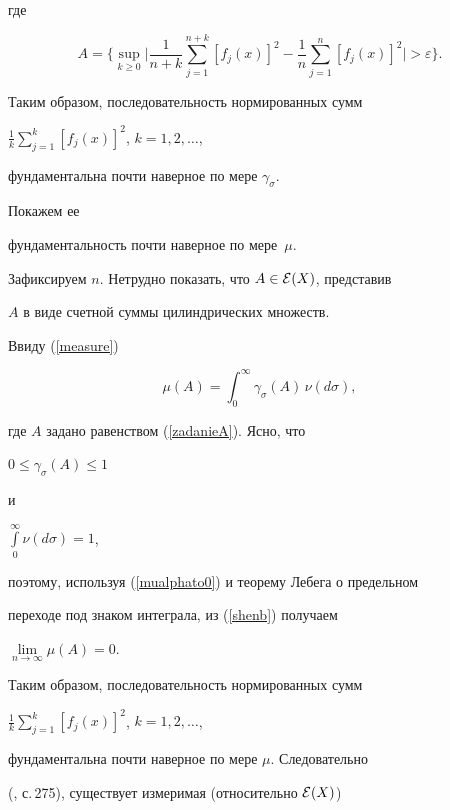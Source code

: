 где


\begin{equation}


A=\bigg\{\sup_{k\ge0}\bigg|\frac1{n+k}\sum_{j=1}^{n+k}[f_j(x)]^2


-\frac1n\sum_{j=1}^n[f_j(x)]^2\bigg|>\varepsilon\bigg\}.


\label{zadanieA}


\end{equation}


Таким образом, последовательность нормированных сумм


$\frac1k\sum\limits_{j=1}^k[f_j(x)]^2$, $k=1,2,\dotsc$,


фундаментальна почти наверное по мере $\gamma_\sigma$.





Покажем ее


фундаментальность почти наверное по мере~$\mu$.


Зафиксируем $n$. Нетрудно показать, что $A\in{\cal E}(X)$, представив


$A$ в виде счетной суммы цилиндрических множеств.





Ввиду (\ref{measure})


\begin{equation}


\mu(A)=\int_0^\infty\gamma_\sigma(A)\,\nu(d\sigma),


\label{shenb}


\end{equation}


где $A$ задано равенством (\ref{zadanieA}). Ясно, что


$0\le\gamma_\sigma(A)\le1$


и


$\int\limits_0^\infty \nu(d\sigma)=1$,


поэтому, используя (\ref{mualphato0}) и теорему Лебега о предельном 


переходе под знаком интеграла, из (\ref{shenb}) получаем


$\lim\limits_{n\to\infty}\mu (A)=0$.


Таким образом, последовательность нормированных сумм


$\frac1k\sum\limits_{j=1}^k[f_j(x)]^2$, $k=1,2,\dotsc$,


фундаментальна почти наверное по мере $\mu$. Следовательно


(\cite{Shir}, с.\,275), существует измеримая (относительно ${\cal E}(X)$)


